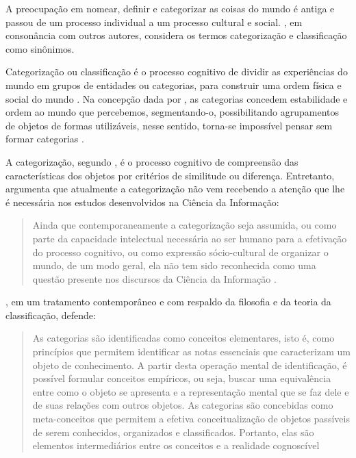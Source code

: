 A preocupação em nomear, definir e categorizar as coisas do mundo é antiga e passou de um processo individual a um processo cultural e social. , em consonância com outros autores, considera os termos categorização e classificação como sinônimos.

Categorização ou classificação é o processo cognitivo de dividir as experiências do mundo em grupos de entidades ou categorias, para construir uma ordem física e social do mundo \cite{lima:2003.interfaces}. Na concepção dada por , as categorias concedem estabilidade e ordem ao mundo que percebemos, segmentando-o, possibilitando agrupamentos de objetos de formas utilizáveis, nesse sentido, torna-se impossível pensar sem formar categorias \cite{artencio:2012.sobre}.

A categorização, segundo , é o processo cognitivo de compreensão das características dos objetos por critérios de similitude ou diferença. Entretanto,  argumenta que atualmente a categorização não vem recebendo a atenção que lhe é necessária nos estudos desenvolvidos na Ciência da Informação:

\begin{quote}
Ainda que contemporaneamente a categorização seja assumida, ou como parte da capacidade intelectual necessária ao ser humano para a efetivação do processo cognitivo, ou como expressão sócio-cultural de organizar o mundo, de um modo geral, ela não tem sido reconhecida como uma questão presente nos discursos da Ciência da Informação \cite[p.58--59]{artencio:2012.sobre}.
\end{quote}

, em um tratamento contemporâneo e com respaldo da filosofia e da teoria da classificação, defende:

\begin{quote}
As categorias são identificadas como conceitos elementares, isto é, como princípios que permitem identificar as notas essenciais que caracterizam um objeto de conhecimento. A partir desta operação mental de identificação, é possível formular conceitos empíricos, ou seja, buscar uma equivalência entre como o objeto se apresenta e a representação mental que se faz dele e de suas relações com outros objetos. As categorias são concebidas como meta-conceitos que permitem a efetiva conceitualização de objetos passíveis de serem conhecidos, organizados e classificados. Portanto, elas são elementos intermediários entre os conceitos e a realidade cognoscível \cite[p.87]{aranalde:2009.reflexoes}
\end{quote}

